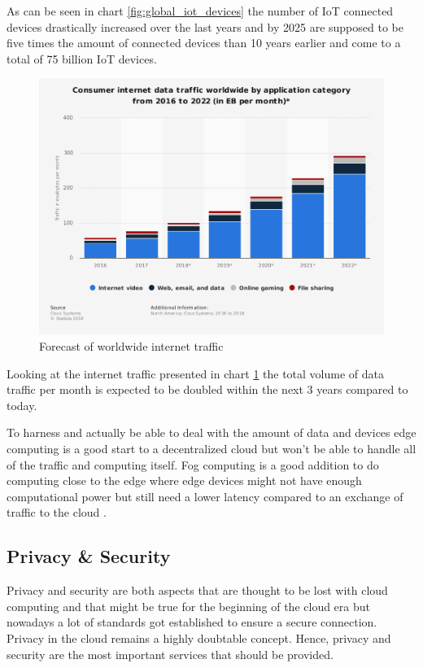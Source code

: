 As can be seen in chart \ref{fig:global_iot_devices} the number of IoT connected devices drastically increased over the last years and by 2025 are supposed to be five times the amount of connected devices than 10 years earlier and come to a total of 75 billion IoT devices.

\begin{figure}[H]
    \centering
    \includegraphics[width=1\textwidth]{resources/images/global_traffic.png}
    \caption{Forecast of worldwide internet traffic}
    \label{fig:global_traffic}
\end{figure}

Looking at the internet traffic presented in chart \ref{fig:global_traffic} the total volume of data traffic per month is expected to be doubled within the next 3 years compared to today.

To harness and actually be able to deal with the amount of data and devices edge computing is a good start to a decentralized cloud but won’t be able to handle all of the traffic and computing itself. Fog computing is a good addition to do computing close to the edge where edge devices might not have enough computational power but still need a lower latency compared to an exchange of traffic to the cloud .

\subsection{Privacy \& Security}
Privacy and security are both aspects that are thought to be lost with cloud computing and that might be true for the beginning of the cloud era but nowadays a lot of standards got established to ensure a secure connection. Privacy in the cloud remains a highly doubtable concept. Hence, privacy and security are the most important services that should be provided. 

